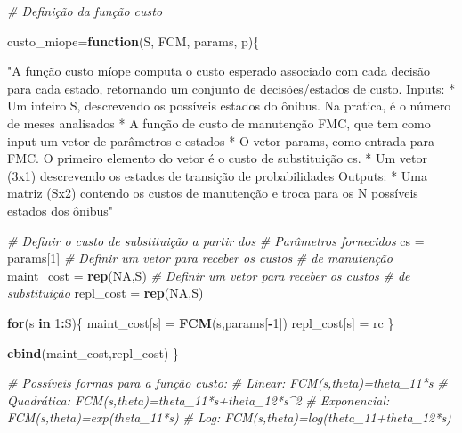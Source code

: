 \documentclass[12pt,a4paper]{article}
\newenvironment{Shaded}{\begin{snugshade}}{\end{snugshade}}
\newcommand{\CommentTok}[1]{\textcolor[rgb]{0.56,0.35,0.01}{\textit{#1}}}
\newcommand{\ControlFlowTok}[1]{\textcolor[rgb]{0.13,0.29,0.53}{\textbf{#1}}}
\newcommand{\DecValTok}[1]{\textcolor[rgb]{0.00,0.00,0.81}{#1}}
\newcommand{\KeywordTok}[1]{\textcolor[rgb]{0.13,0.29,0.53}{\textbf{#1}}}
\newcommand{\NormalTok}[1]{#1}
\newcommand{\OperatorTok}[1]{\textcolor[rgb]{0.81,0.36,0.00}{\textbf{#1}}}
\newcommand{\OtherTok}[1]{\textcolor[rgb]{0.56,0.35,0.01}{#1}}
\newcommand{\StringTok}[1]{\textcolor[rgb]{0.31,0.60,0.02}{#1}}
\begin{document}
\begin{Shaded}
\begin{Highlighting}[]
\CommentTok{# Definição da função custo}

\NormalTok{custo_miope=}\ControlFlowTok{function}\NormalTok{(S, FCM, params, p)\{}
  
  \StringTok{"A função custo míope computa o custo esperado associado com}
\StringTok{  cada decisão para cada estado, retornando um conjunto de }
\StringTok{  decisões/estados de custo.}
\StringTok{    }
\StringTok{   Inputs:}
\StringTok{    * Um inteiro S, descrevendo os possíveis estados do ônibus.}
\StringTok{    Na pratica, é o número de meses analisados}
\StringTok{    * A função de custo de manutenção FMC, que tem como input }
\StringTok{    um vetor de parâmetros e estados}
\StringTok{    * O vetor params, como entrada para FMC. O primeiro elemento do vetor }
\StringTok{      é o custo de substituição cs.}
\StringTok{    * Um vetor (3x1) descrevendo os estados de transição de probabilidades }
\StringTok{        }
\StringTok{    Outputs:}
\StringTok{    * Uma matriz (Sx2) contendo os custos de manutenção e troca para os N }
\StringTok{      possíveis estados dos ônibus"}
  
  \CommentTok{# Definir o custo de substituição a partir dos }
  \CommentTok{# Parâmetros fornecidos}
\NormalTok{  cs =}\StringTok{ }\NormalTok{params[}\DecValTok{1}\NormalTok{]}
  \CommentTok{# Definir um vetor para receber os custos}
  \CommentTok{# de manutenção}
\NormalTok{  maint_cost =}\StringTok{ }\KeywordTok{rep}\NormalTok{(}\OtherTok{NA}\NormalTok{,S)}
  \CommentTok{# Definir um vetor para receber os custos}
  \CommentTok{# de substituição}
\NormalTok{  repl_cost =}\StringTok{ }\KeywordTok{rep}\NormalTok{(}\OtherTok{NA}\NormalTok{,S)}
  
  \ControlFlowTok{for}\NormalTok{(s }\ControlFlowTok{in} \DecValTok{1}\OperatorTok{:}\NormalTok{S)\{}
\NormalTok{    maint_cost[s] =}\StringTok{ }\KeywordTok{FCM}\NormalTok{(s,params[}\OperatorTok{-}\DecValTok{1}\NormalTok{])}
\NormalTok{    repl_cost[s] =}\StringTok{ }\NormalTok{rc}
\NormalTok{  \}}
  
  \KeywordTok{cbind}\NormalTok{(maint_cost,repl_cost)}
\NormalTok{\}}

\CommentTok{# Possíveis formas para a função custo:}
\CommentTok{# Linear: FCM(s,theta)=theta_11*s}
\CommentTok{# Quadrática: FCM(s,theta)=theta_11*s+theta_12*s^2}
\CommentTok{# Exponencial: FCM(s,theta)=exp(theta_11*s)}
\CommentTok{# Log: FCM(s,theta)=log(theta_11+theta_12*s)}


\end{Highlighting}
\end{Shaded}
\end{document}
